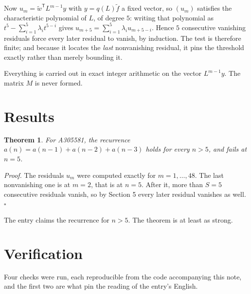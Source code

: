 \documentclass[11pt]{article}
\newtheorem{theorem}{Theorem}
\theoremstyle{definition}
\begin{document}
Now $u_m = \tilde w^{\mathsf T} L^{m-1} y$ with $y = q(L)\tilde f$ a fixed vector, so $(u_m)$ satisfies the characteristic polynomial of $L$, of degree $5$: writing that polynomial as $t^{5} - \sum_{i=1}^{5} \lambda_i t^{5-i}$ gives $u_{m+5} = \sum_{i=1}^{5} \lambda_i u_{m+5-i}$. Hence $5$ consecutive vanishing residuals force every later residual to vanish, by induction. The test is therefore finite; and because it locates the {\itshape last} nonvanishing residual, it pins the threshold exactly rather than merely bounding it.

Everything is carried out in exact integer arithmetic on the vector $L^{m-1}y$. The matrix $M$ is never formed.

\section{Results}

\begin{theorem} For A305581, the recurrence $a(n) = a(n-1) + a(n-2) + a(n-3)$ holds for every $n > 5$, and fails at $n = 5$.\end{theorem}

{\itshape Proof.} The residuals $u_m$ were computed exactly for $m = 1,\dots,48$. The last nonvanishing one is at $m = 2$, that is at $n = 5$. After it, more than $S = 5$ consecutive residuals vanish, so by Section 5 every later residual vanishes as well. $\square$

The entry claims the recurrence for $n > 5$. The theorem is at least as strong.

\section{Verification}

Four checks were run, each reproducible from the code accompanying this note, and the first two are what pin the reading of the entry's English.
\end{document}
